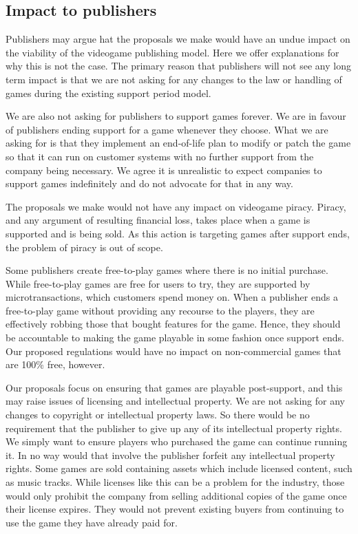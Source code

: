 \subsection{Impact to publishers}
Publishers may argue hat the proposals we make would have an undue impact on the viability of the videogame publishing model.
Here we offer explanations for why this is not the case.
The primary reason that publishers will not see any long term impact is that we are not asking for any changes to the law or handling of games during the existing support period model.

We are also not asking for publishers to support games forever.
We are in favour of publishers ending support for a game whenever they choose.
What we are asking for is that they implement an end-of-life plan to modify or patch the game
so that it can run on customer systems with no further support from the company being necessary.
We agree it is unrealistic to expect companies to support games indefinitely and do not advocate for that in any way.

The proposals we make would not have any impact on videogame piracy.
Piracy, and any argument of resulting financial loss, takes place when a game is supported and is being sold\cn.
As this action is targeting games after support ends, the problem of piracy is out of scope.

Some publishers create free-to-play games where there is no initial purchase.
While free-to-play games are free for users to try, they are supported by microtransactions, which customers spend money on\cn.
When a publisher ends a free-to-play game without providing any recourse to the players, they are effectively robbing those that bought features for the game.
Hence, they should be accountable to making the game playable in some fashion once support ends.
Our proposed regulations would have no impact on non-commercial games that are 100\% free, however.

Our proposals focus on ensuring that games are playable post-support, and this may raise issues of licensing and intellectual property.
We are not asking for any changes to copyright or intellectual property laws.
So there would be no requirement that the publisher to give up any of its intellectual property rights.
We simply want to ensure players who purchased the game can continue running it.
In no way would that involve the publisher forfeit any intellectual property rights.
Some games are sold containing assets which include licensed content, such as music tracks.
While licenses like this can be a problem for the industry, those would only prohibit the company from selling additional copies of the game once their license expires.
They would not prevent existing buyers from continuing to use the game they have already paid for.

